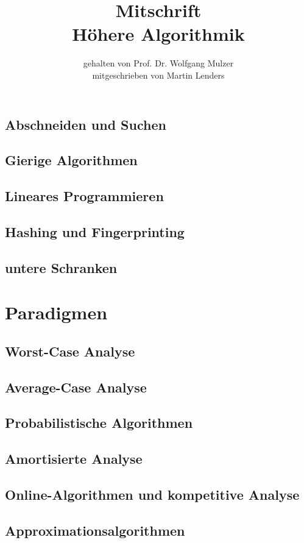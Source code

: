 \documentclass[a4paper,10pt]{scrbook}
\title{Mitschrift\\{\LARGE Höhere Algorithmik}}
\author{gehalten von Prof. Dr. Wolfgang Mulzer \\ mitgeschrieben von Martin Lenders}
\begin{document}
\maketitle
\tableofcontents








\section{Abschneiden und Suchen}
\section{Gierige Algorithmen}
\section{Lineares Programmieren}
\section{Hashing und Fingerprinting}
\section{untere Schranken}
\chapter{Paradigmen}
\section{Worst-Case Analyse}
\section{Average-Case Analyse}
\section{Probabilistische Algorithmen}
\section{Amortisierte Analyse}
\section{Online-Algorithmen und kompetitive Analyse}
\section{Approximationsalgorithmen}
\end{document}
